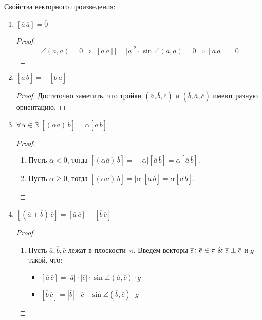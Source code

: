 Свойства векторного произведения:
\begin{enumerate}
	\item $[\overline a\,\overline a] = \overline 0$
	\begin{proof}
	\begin{equation*}
	\angle(\overline a, \overline a) = 0 \Rightarrow
	|[\overline a\,\overline a]| = |\overline a|^2 \cdot \sin \angle(\overline a, \overline a) = 0 \Rightarrow
	[\overline a\,\overline a] = \overline 0
	\end{equation*}
	\end{proof}
	
	\item $[\overline a\,\overline b] = -[\overline b\,\overline a]$
	\begin{proof}
	Достаточно заметить, что тройки $(\overline a, \overline b, \overline c)$ и $(\overline b, \overline a, \overline c)$ имеют разную ориентацию.
	\end{proof}
	
	\item $\forall \alpha \in \mathbb R \ [(\alpha \overline a)\,\overline b] = \alpha [\overline a\,\overline b]$
	\begin{proof}
	\begin{enumerate}
		\item Пусть $\alpha < 0$, тогда $[(\alpha \overline a)\,\overline b] = -|\alpha| [\overline a\,\overline b] = \alpha [\overline a\,\overline b]$.
		\item Пусть $\alpha \geqslant 0$, тогда $[(\alpha \overline a)\,\overline b] = |\alpha| [\overline a\,\overline b] = \alpha [\overline a\,\overline b]$.
	\end{enumerate}
	\end{proof}
	
	\item $[(\overline a + \overline b)\,\overline c] = [\overline a\,\overline c] + [\overline b\,\overline c]$
	\begin{proof}
	\begin{enumerate}
		\item Пусть $\overline a, \overline b, \overline c$ лежат в плоскости~$\pi$.
		Введём векторы $\overline e \colon \overline e \in \pi \mathrel{\&} \overline e \perp \overline c$ и $\overline g$ такой, что:
		\begin{itemize}
			\item $[\overline a\,\overline c] = |\overline a| \cdot |\overline c| \cdot \sin \angle(\overline a, \overline c) \cdot \overline g$
			\item $[\overline b\,\overline c] = |\overline b| \cdot |\overline c| \cdot \sin \angle(\overline b, \overline c) \cdot \overline g$
		\end{itemize}
		

\end{enumerate}
\end{proof}
\end{enumerate}
